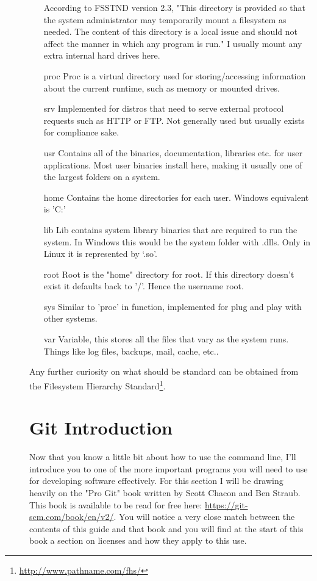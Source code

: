 \documentclass[a4paper,11pt]{report}
\begin{document}
\begin{description}
\begin{itemize}
								According to FSSTND version 2.3, "This directory is provided so that the system administrator may temporarily mount a filesystem as needed. The content of this directory is a local issue and should not affect the manner in which any program is run." I usually mount any extra internal hard drives here.
							\item[proc]
								Proc is a virtual directory used for storing/accessing information about the current runtime, such as memory or mounted drives.
							\item[srv]
								Implemented for distros that need to serve external protocol requests such as HTTP or FTP. Not generally used but usually exists for compliance sake.
							\item[usr]
								Contains all of the binaries, documentation, libraries etc. for user applications. Most user binaries install here, making it usually one of the largest folders on a system.
							\item[home]
								Contains the home directories for each user. Windows equivalent is 'C:\Users'
							\item[lib]
								Lib contains system library binaries that are required to run the system. In Windows this would be the system folder with .dlls. Only in Linux it is represented by ‘.so’.
							\item[root]
								Root is the "home" directory for root. If this directory doesn’t exist it defaults back to '/'. Hence the username root.
							\item[sys]
								Similar to 'proc' in function, implemented for plug and play with other systems.
							\item[var]
								Variable, this stores all the files that vary as the system runs. Things like log files, backups, mail, cache, etc..
						\end{itemize}

						Any further curiosity on what should be standard can be obtained from the Filesystem Hierarchy Standard\footnote{\url{http://www.pathname.com/fhs/}}.

					\section{Git Introduction}
						Now that you know a little bit about how to use the command line, I'll introduce you to one of the more important programs you will need to use for developing software effectively.
						For this section I will be drawing heavily on the "Pro Git" book written by Scott Chacon and Ben Straub. This book is available to be read for free here: \url{https://git-scm.com/book/en/v2/}.
						You will notice a very close match between the contents of this guide and that book and you will find at the start of this book a section on licenses and how they apply to this use.


\end{description}
\end{document}
